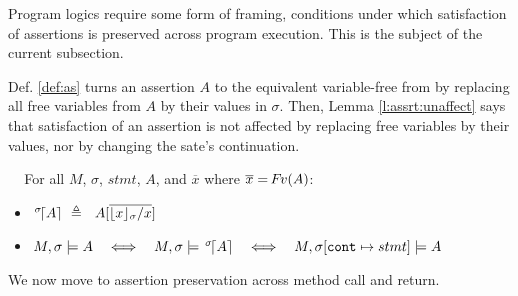 

Program logics require some form of framing, \ie conditions under which  satisfaction of  assertions is preserved across program execution. 
This is the subject of  the current subsection.

Def. \ref{def:as}  turns an assertion  $A$ %
to the equivalent variable-free from by replacing all free variables from $A$ by their values in $\sigma$. %
 Then,   Lemma \ref{l:assrt:unaffect}  says  that 
satisfaction of an assertion is not affected by replacing free  variables by their values, nor by changing the sate's continuation.

\begin{definitionAndLemma} $ $ ~
\label{def:as}
\label{lemma:addr:expr}
\label{l:assrt:unaffect}
For all $M$, $\sigma$,  $stmt$,   $A$, and $\overline x$ where  $\overline x = {\hspace{-1pt}F\hspace{-1pt}}v{(A)}$:

\begin{itemize}  
\item

${\as  \sigma A} \ \triangleq \ \ A[\overline {{\interpret {\sigma} {x}}/x}]$\  
\item
$\satisfiesA{M}{\sigma}{A}   \ \ \ \Longleftrightarrow\ \ \ \satisfiesA{M}{\sigma}{{\as {\sigma} A} }    \ \ \ \Longleftrightarrow\ \ \  \satisfiesA{M}{\sigma[\prg{cont}\mapsto stmt]}{A}$ 
\end{itemize}
\end{definitionAndLemma}

%
%
%

 \noindent
We now move to assertion preservation across method call and return.  


